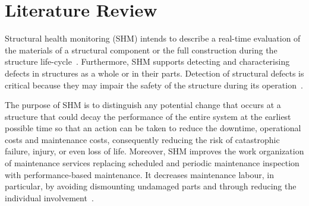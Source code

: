 \chapter[Literature Review]{Literature Review}
\label{ch2}
Structural health monitoring (SHM) intends to describe a real-time evaluation 
of the materials of a structural component or the full construction during the structure life-cycle~\cite{Balageas2010}. 
Furthermore, SHM supports detecting and characterising defects in structures 
as a whole or in their parts.
Detection of structural defects is critical because they may impair the safety of the structure during its operation~\cite{Yuan2016}. 

The purpose of SHM is to distinguish any potential change that occurs at a structure that could decay the performance of the entire system at the earliest possible time so that an action can be taken to reduce the downtime, operational costs and maintenance costs, consequently reducing the risk of 
catastrophic failure, injury, or even loss of life.
Moreover, SHM improves the work organization of maintenance services replacing scheduled and periodic maintenance inspection with performance-based maintenance.
It decreases maintenance labour, in particular, by avoiding dismounting undamaged parts and through reducing the individual involvement~\cite{Balageas2010}.

